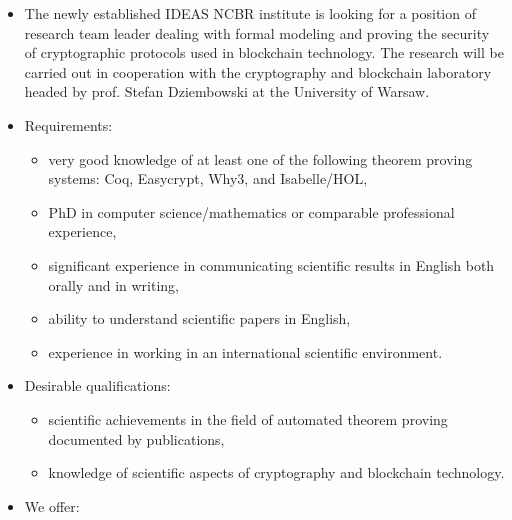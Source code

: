 \documentclass[prodmode,acmtecs]{acmsmall} %
\begin{document}
\begin{itemize}\item  The newly established IDEAS NCBR institute is looking for a position of research team leader  dealing with formal modeling and proving the security of cryptographic protocols used in blockchain technology. The research will be carried out in cooperation with the cryptography and blockchain laboratory headed by prof. Stefan Dziembowski at the University of Warsaw. 
 
\item  Requirements: 
 
\begin{itemize}\item  very good knowledge of at least one of the following theorem proving systems: Coq, Easycrypt, Why3, and Isabelle/HOL,
\item  PhD in computer science/mathematics or comparable professional experience,
\item  significant experience in communicating scientific results in English both orally and in writing,
\item  ability to understand scientific papers in English,
\item  experience in working in an international scientific environment.
\end{itemize} 
\item  Desirable qualifications: 
 
\begin{itemize}\item  scientific achievements in the field of automated theorem proving documented by publications,
\item  knowledge of scientific aspects of cryptography and blockchain technology.
\end{itemize} 
\item  We offer: 
 

\end{itemize}
\end{document}
